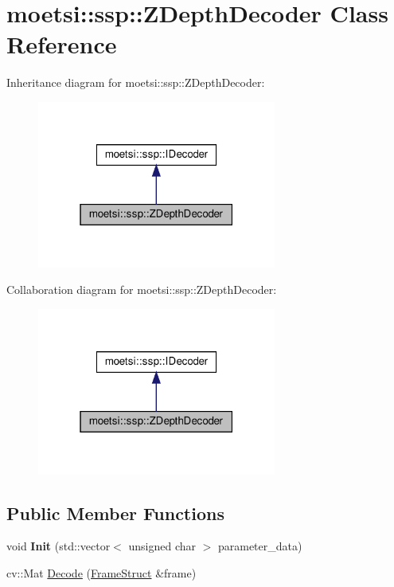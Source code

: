 \hypertarget{classmoetsi_1_1ssp_1_1ZDepthDecoder}{}\section{moetsi\+:\+:ssp\+:\+:Z\+Depth\+Decoder Class Reference}
\label{classmoetsi_1_1ssp_1_1ZDepthDecoder}


Inheritance diagram for moetsi\+:\+:ssp\+:\+:Z\+Depth\+Decoder\+:\nopagebreak
\begin{figure}[H]
\begin{center}
\leavevmode
\includegraphics[width=223pt]{classmoetsi_1_1ssp_1_1ZDepthDecoder__inherit__graph}
\end{center}
\end{figure}


Collaboration diagram for moetsi\+:\+:ssp\+:\+:Z\+Depth\+Decoder\+:\nopagebreak
\begin{figure}[H]
\begin{center}
\leavevmode
\includegraphics[width=223pt]{classmoetsi_1_1ssp_1_1ZDepthDecoder__coll__graph}
\end{center}
\end{figure}
\subsection*{Public Member Functions}
\begin{DoxyCompactItemize}
\item 
\mbox{\label{classmoetsi_1_1ssp_1_1ZDepthDecoder_aad7fe4789b709fc3496a1837a8ff86e5}} 
void {\bfseries Init} (std\+::vector$<$ unsigned char $>$ parameter\+\_\+data)
\item 
cv\+::\+Mat \hyperlink{classmoetsi_1_1ssp_1_1ZDepthDecoder_a43226095658d616f7e38df1d43c2f88a}{Decode} (\hyperlink{structmoetsi_1_1ssp_1_1FrameStruct}{Frame\+Struct} \&frame)
\end{DoxyCompactItemize}


